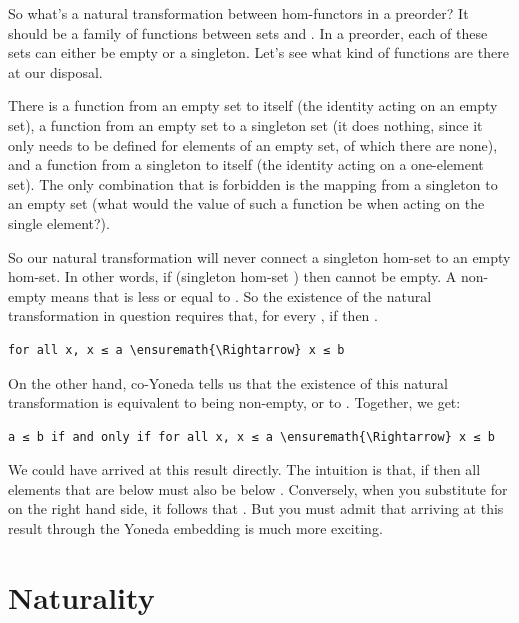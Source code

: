 So what's a natural transformation between hom-functors in a preorder?
It should be a family of functions between sets  and
. In a preorder, each of these sets can either be empty
or a singleton. Let's see what kind of functions are there at our
disposal.

There is a function from an empty set to itself (the identity acting on
an empty set), a function  from an empty set to a
singleton set (it does nothing, since it only needs to be defined for
elements of an empty set, of which there are none), and a function from
a singleton to itself (the identity acting on a one-element set). The
only combination that is forbidden is the mapping from a singleton to an
empty set (what would the value of such a function be when acting on the
single element?).

So our natural transformation will never connect a singleton hom-set to
an empty hom-set. In other words, if 
(singleton hom-set ) then  cannot be
empty. A non-empty  means that  is less or
equal to . So the existence of the natural transformation in
question requires that, for every , if
 then .

\begin{Verbatim}[commandchars=\\\{\}]
for all x, x ≤ a \ensuremath{\Rightarrow} x ≤ b
\end{Verbatim}
On the other hand, co-Yoneda tells us that the existence of this natural
transformation is equivalent to  being non-empty, or to
. Together, we get:

\begin{Verbatim}[commandchars=\\\{\}]
a ≤ b if and only if for all x, x ≤ a \ensuremath{\Rightarrow} x ≤ b
\end{Verbatim}
We could have arrived at this result directly. The intuition is that, if
 then all elements that are below 
must also be below . Conversely, when you substitute
 for  on the right hand side, it follows that
. But you must admit that arriving at this
result through the Yoneda embedding is much more exciting.

\section{Naturality}\label{naturality}

